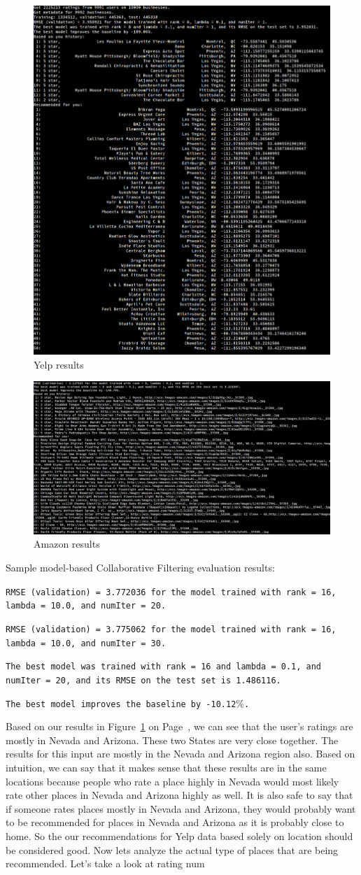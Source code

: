 \documentclass[conference]{IEEEtran}
\begin{document}
\begin{figure}
  \centering
  \includegraphics[width=.48\textwidth, clip=true, trim = 0cm 18cm 7cm 1cm]{image/yelp_results}
  \caption{Yelp results}
  \label{fig:yelp.cmd.results}
\end{figure}

\begin{figure}
  \centering
  \includegraphics[width=.48\textwidth, clip=true, trim = 0cm 13cm 15cm 1cm]{image/amazon_results_crop}
  \caption{Amazon results}
  \label{fig:amazon.cmd.results}
\end{figure}


Sample model-based Collaborative Filtering evaluation results: 

\texttt{RMSE (validation) = 3.772036 for the model trained with rank = 16, lambda = 10.0, and numIter = 20.}

\texttt{RMSE (validation) = 3.775062 for the model trained with rank = 16, lambda = 10.0, and numIter = 30.}

\texttt{The best model was trained with rank = 16 and lambda = 0.1, and numIter = 20, and its RMSE on the test set is 1.486116.}

\texttt{The best model improves the baseline by -10.12$\%$.}

Based on our results in Figure~\ref{fig:yelp.cmd.results} on Page~\pageref{fig:yelp.cmd.results}, we can see that the user's ratings are mostly in Nevada and Arizona.  These two States are very close together.  The results for this input are mostly in the Nevada and Arizona region also.  Based on intuition, we can say that it makes sense that these results are in the same locations because people who rate a place highly in Nevada would most likely rate other places in Nevada and Arizona highly as well.  It is also safe to say that if someone rates places mostly in Nevada and Arizona, they would probably want to be recommended for places in Nevada and Arizona as it is probably close to home.  So the our recommendations for Yelp data based solely on location should be considered good.  Now lets analyze the actual type of places that are being recommended.  Let's take a look at rating num
\end{document}
